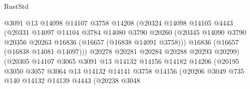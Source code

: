 \begin{lexlean}{RustStd}
\begin{coremodule}
                                  @3091
                                  @13
                                  @14098
                                  @14107
                                  @3758
                                  @14208
                                  (@20324
                                    @14098
                                    @14105
                                    @4443
                                    (@20331
                                      @14097
                                      @14104
                                      @3784
                                      @14080
                                      @3790
                                      @20260
                                      (@20345
                                        @14090
                                        @3790
                                        @20356
                                        @20263
                                        @16836
                                        (@16657 (@16838 @14091 @3758)))
                                      @16836
                                      (@16657 (@16838 @14081 @14097)))
                                    @20278
                                    @20281
                                    @20284
                                    @20288
                                    @20293
                                    @20299)
                                  (@20305
                                    @14107
                                    @3065
                                    @3091
                                    @13
                                    @14132
                                    @14156
                                    @14182
                                    @14206
                                    (@20195
                                      @3050
                                      @3057
                                      @3064
                                      @13
                                      @14132
                                      @14141
                                      @3758
                                      @14156
                                      (@20206
                                        @3049
                                        @735
                                        @140
                                        @14132
                                        @14139
                                        @4443
                                        (@20238
                                          @3048

\end{coremodule}
\end{lexlean}
